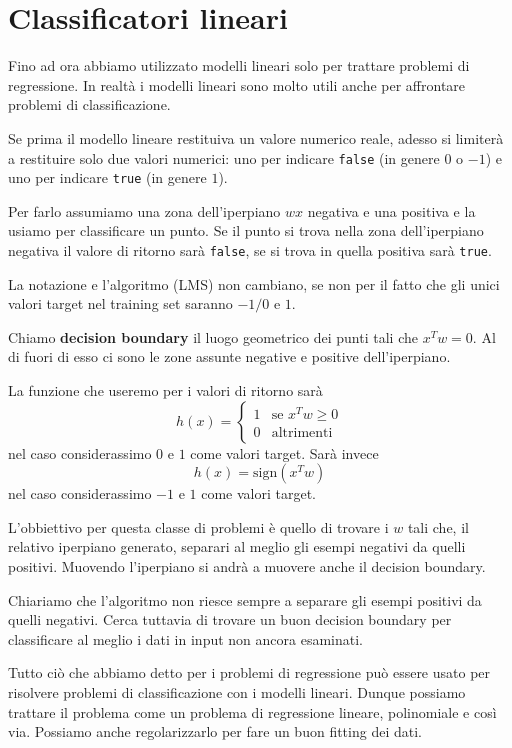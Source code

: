 \chapter{Classificatori lineari}
Fino ad ora abbiamo utilizzato modelli lineari solo per trattare problemi di regressione. In realt\`a i modelli lineari
sono molto utili anche per affrontare problemi di classificazione.

Se prima il modello lineare restituiva un valore numerico reale, adesso si limiter\`a a restituire solo due valori
numerici: uno per indicare \verb|false| (in genere $0$ o $-1$) e uno per indicare \verb|true| (in genere $1$).

Per farlo assumiamo una zona dell'iperpiano $wx$ negativa e una positiva e la usiamo per classificare un punto. Se il
punto si trova nella zona dell'iperpiano negativa il valore di ritorno sar\`a \verb|false|, se si trova in quella
positiva sar\`a \verb|true|.

La notazione e l'algoritmo (LMS) non cambiano, se non per il fatto che gli unici valori target nel training set saranno
$-1/0$ e $1$.

\begin{definition}
	Chiamo \textbf{decision boundary} il luogo geometrico dei punti tali che $x^T w = 0$. Al di fuori di esso ci sono
	le zone assunte negative e positive dell'iperpiano.
\end{definition}

La funzione che useremo per i valori di ritorno sar\`a
\[
	h(x) = \begin{cases}
		1 & \text{se } x^T w \geq 0 \\
		0 & \text{altrimenti}
	\end{cases}
\]
nel caso considerassimo $0$ e $1$ come valori target. Sar\`a invece
\[ h(x) = \text{sign}(x^T w) \]
nel caso considerassimo $-1$ e $1$ come valori target.

L'obbiettivo per questa classe di problemi \`e quello di trovare i $w$ tali che, il relativo iperpiano generato,
separari al meglio gli esempi negativi da quelli positivi. Muovendo l'iperpiano si andr\`a a muovere anche il
decision boundary.

Chiariamo che l'algoritmo non riesce sempre a separare gli esempi positivi da quelli negativi. Cerca tuttavia di
trovare un buon decision boundary per classificare al meglio i dati in input non ancora esaminati.

Tutto ci\`o che abbiamo detto per i problemi di regressione pu\`o essere usato per risolvere problemi di classificazione
con i modelli lineari. Dunque possiamo trattare il problema come un problema di regressione lineare, polinomiale e cos\`i
via. Possiamo anche regolarizzarlo per fare un buon fitting dei dati.

